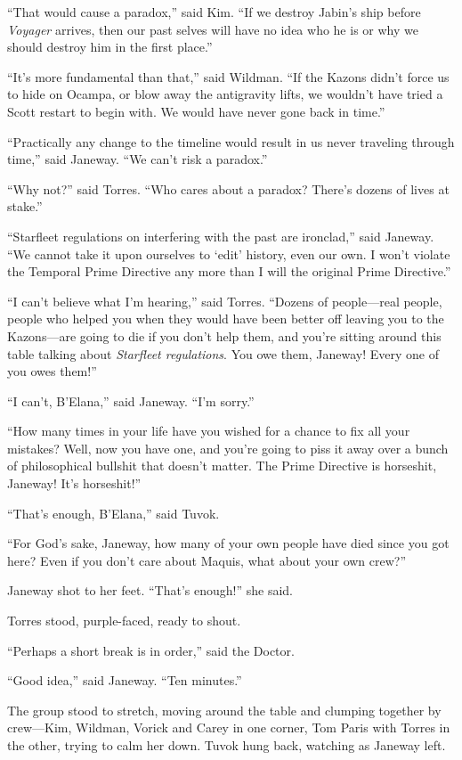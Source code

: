 \documentclass[twoside,letterpaper,12pt]{memoir}
\begin{document}
``That would cause a paradox,'' said Kim. ``If we destroy Jabin's ship before \textit{Voyager} arrives, then our past selves will have no idea who he is or why we should destroy him in the first place.'' 

``It's more fundamental than that,'' said Wildman. ``If the Kazons didn't force us to hide on Ocampa, or blow away the antigravity lifts, we wouldn't have tried a Scott restart to begin with. We would have never gone back in time.'' 

``Practically any change to the timeline would result in us never traveling through time,'' said Janeway. ``We can't risk a paradox.'' 

``Why not?'' said Torres. ``Who cares about a paradox? There's dozens of lives at stake.'' 

``Starfleet regulations on interfering with the past are ironclad,'' said Janeway. ``We cannot take it upon ourselves to `edit' history, even our own. I won't violate the Temporal Prime Directive any more than I will the original Prime Directive.'' 

``I can't believe what I'm hearing,'' said Torres. ``Dozens of people---real people, people who helped you when they would have been better off leaving you to the Kazons---are going to die if you don't help them, and you're sitting around this table talking about \textit{Starfleet regulations}. You owe them, Janeway! Every one of you owes them!'' 

``I can't, B'Elana,'' said Janeway. ``I'm sorry.'' 

``How many times in your life have you wished for a chance to fix all your mistakes? Well, now you have one, and you're going to piss it away over a bunch of philosophical bullshit that doesn't matter. The Prime Directive is horseshit, Janeway! It’s horseshit!'' 

``That's enough, B'Elana,'' said Tuvok. 

``For God's sake, Janeway, how many of your own people have died since you got here? Even if you don't care about Maquis, what about your own crew?'' 

Janeway shot to her feet. ``That's enough!'' she said. 

Torres stood, purple-faced, ready to shout. 

``Perhaps a short break is in order,'' said the Doctor. 

``Good idea,'' said Janeway. ``Ten minutes.'' 

The group stood to stretch, moving around the table and clumping together by crew---Kim, Wildman, Vorick and Carey in one corner, Tom Paris with Torres in the other, trying to calm her down. Tuvok hung back, watching as Janeway left. 
\end{document}
